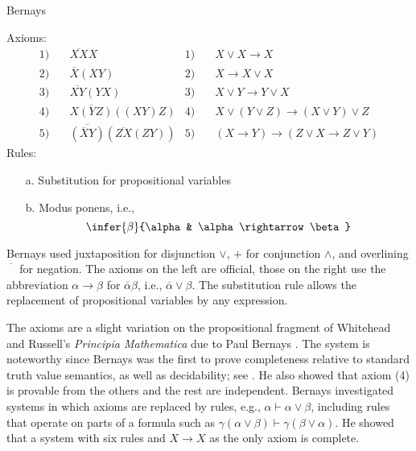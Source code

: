 \begin{entry}{Bernays}  

\begin{calculus}
Axioms:
\begin{align*}
1)\quad & \overline{XX}X &
1)\quad & X \lor X \rightarrow X\\
2) \quad & \overline{X}(XY) &
2) \quad & X \rightarrow X \lor X\\
3) \quad & \overline{XY}(YX) &
3) \quad & X \lor Y \rightarrow Y \lor X \\
4) \quad & \overline{X(YZ)}((XY)Z) &
4) \quad & X \lor (Y \lor Z) \rightarrow (X \lor Y) \lor Z \\
5) \quad & \overline{(\overline{X}Y)}(\overline{ZX}(ZY)) &
5) \quad & (X \rightarrow Y) \rightarrow (Z \lor X \rightarrow Z \lor Y) 
\end{align*}
Rules:
\begin{enumerate}
\item[a.] Substitution for propositional variables
\item[b.] Modus ponens, i.e.,
\[
\infer{\beta}{\alpha & \alpha \rightarrow \beta}
\]
\end{enumerate}

\end{calculus}

\begin{clarifications}
Bernays used juxtaposition for disjunction $\lor$, $+$ for conjunction
$\land$, and overlining $\overline{\phantom{X}}$ for
negation. The axioms on the left are official, those on the right use the abbreviation $\alpha \rightarrow \beta$ for
$\overline{\alpha}\beta$, i.e., $\overline{\alpha} \lor \beta$. The substitution
rule allows the replacement of propositional variables by any
expression.
\end{clarifications}

\begin{history}
The axioms are a slight variation on the propositional fragment of
Whitehead and Russell's \emph{Principia
Mathematica}  due to Paul
Bernays \cite{Bernays1918}.  The system is noteworthy since Bernays
was the first to prove completeness relative to standard truth value
semantics, as well as decidability; see \cite{Zach1999}. He also
showed that axiom (4) is provable from the others and the rest are
independent. Bernays investigated systems in which axioms are replaced
by rules, e.g., $\alpha \vdash \alpha \lor \beta$, including rules
that operate on parts of a formula such as
$\gamma(\alpha \lor \beta) \vdash \gamma(\beta \lor \alpha)$. He showed
that a system with six rules and $X \rightarrow X$ as the only axiom
is complete.
\end{history}


\end{entry}
